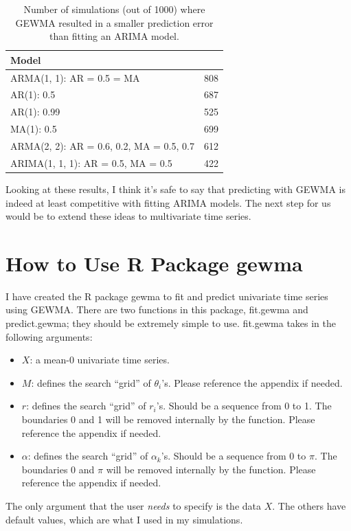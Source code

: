 \documentclass[12pt]{article}
\begin{document}
\begin{table}[t]
\center
\begin{tabular}{l|l}
Model&\\
\hline
ARMA(1, 1): AR = 0.5 = MA&808\\
AR(1): 0.5&687\\
AR(1): 0.99&525\\
MA(1): 0.5&699\\
ARMA(2, 2): AR = 0.6, 0.2, MA = 0.5, 0.7&612\\
ARIMA(1, 1, 1): AR = 0.5, MA = 0.5&422
\end{tabular}
\caption{Number of simulations (out of 1000) where GEWMA resulted in a smaller prediction error than fitting an ARIMA model.}
\end{table}

Looking at these results, I think it's safe to say that predicting with GEWMA is indeed at least competitive with fitting ARIMA models. The next step for us would be to extend these ideas to multivariate time series.

\section*{How to Use R Package gewma}

I have created the R package gewma to fit and predict univariate time series using GEWMA. There are two functions in this package, fit.gewma and predict.gewma; they should be extremely simple to use. fit.gewma takes in the following arguments:

\begin{itemize}
\item $X$: a mean-0 univariate time series.
\item $M$: defines the search ``grid'' of $\theta_i$'s. Please reference the appendix if needed.
\item $r$: defines the search ``grid'' of $r_i$'s. Should be a sequence from 0 to 1. The boundaries 0 and 1 will be removed internally by the function. Please reference the appendix if needed.
\item $\alpha$: defines the search ``grid'' of $\alpha_k$'s. Should be a sequence from 0 to $\pi$. The boundaries 0 and $\pi$ will be removed internally by the function. Please reference the appendix if needed.
\end{itemize}

The only argument that the user \emph{needs} to specify is the data $X$. The others have default values, which are what I used in my simulations.
\end{document}
